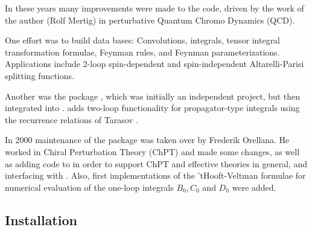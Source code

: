 In these years many improvements were made to the code, driven by the work of the author (Rolf Mertig) in perturbative Quantum Chromo Dynamics (QCD).

One effort was to build data bases: Convolutions, integrals, tensor integral transformation formulae, Feynman rules, and Feynman parameterizations. Applications include 2-loop spin-dependent and spin-independent Altarelli-Parisi splitting functions.

Another was the package \tarcer, which was initially an independent project, but then integrated into \fc.  \tarcer \cite{Mertig:1998vk} adds two-loop functionality for propagator-type integrals using the recurrence relations of Tarasov \cite{Tarasov:1997kx}.

In 2000 maintenance of the package was taken over by Frederik Orellana. He worked in Chiral Perturbation Theory \cite{Gasser:1984gg} (ChPT) and made some changes, as well as adding code to \fc in order to support ChPT and effective theories in general, and interfacing with \fa. Also, first implementations of the 'tHooft-Veltman formulae \cite{'tHooft:1978xw} for numerical evaluation of the one-loop integrals $B_0, C_0$ and $D_0$ were added.

\subsection{Installation}

